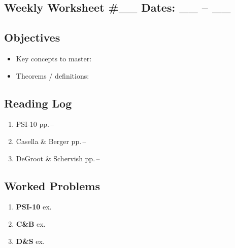 \documentclass[12pt]{article}
\begin{document}
\begin{center}
\begin{minipage}[t][\textheight]{\textwidth}  %
  \section*{Weekly Worksheet \#\_\_ \hfill Dates: \_\_ -- \_\_}

  \subsection*{Objectives}
  \begin{itemize}[noitemsep]
    \item Key concepts to master:
    \item Theorems / definitions:
  \end{itemize}
  \subsection*{Reading Log}
  \begin{enumerate}[label=\arabic*.,itemsep=1.2em]
    \item PSI-10 pp.\,\underline{\hspace{1.8cm}}--\underline{\hspace{1.8cm}}
    \item Casella \& Berger pp.\,\underline{\hspace{1.8cm}}--\underline{\hspace{1.8cm}}
    \item DeGroot \& Schervish pp.\,\underline{\hspace{1.8cm}}--\underline{\hspace{1.8cm}}
  \end{enumerate}

  \subsection*{Worked Problems}
  \begin{enumerate}[label=\arabic*.,itemsep=1.2em]
    \item \textbf{PSI-10} ex.\,\underline{\hspace{1cm}}
    \item \textbf{C\&B}   ex.\,\underline{\hspace{1cm}}
    \item \textbf{D\&S}   ex.\,\underline{\hspace{1cm}}
  \end{enumerate}


\end{minipage}
\end{center}
\end{document}
